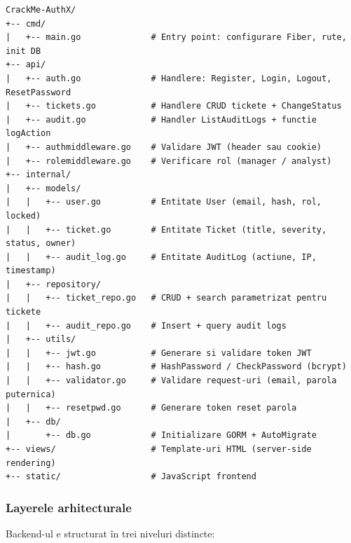 \documentclass[12pt]{article}
\begin{document}
\begin{verbatim}
CrackMe-AuthX/
+-- cmd/
|   +-- main.go              # Entry point: configurare Fiber, rute, init DB
+-- api/
|   +-- auth.go              # Handlere: Register, Login, Logout, ResetPassword
|   +-- tickets.go           # Handlere CRUD tickete + ChangeStatus
|   +-- audit.go             # Handler ListAuditLogs + functie logAction
|   +-- authmiddleware.go    # Validare JWT (header sau cookie)
|   +-- rolemiddleware.go    # Verificare rol (manager / analyst)
+-- internal/
|   +-- models/
|   |   +-- user.go          # Entitate User (email, hash, rol, locked)
|   |   +-- ticket.go        # Entitate Ticket (title, severity, status, owner)
|   |   +-- audit_log.go     # Entitate AuditLog (actiune, IP, timestamp)
|   +-- repository/
|   |   +-- ticket_repo.go   # CRUD + search parametrizat pentru tickete
|   |   +-- audit_repo.go    # Insert + query audit logs
|   +-- utils/
|   |   +-- jwt.go           # Generare si validare token JWT
|   |   +-- hash.go          # HashPassword / CheckPassword (bcrypt)
|   |   +-- validator.go     # Validare request-uri (email, parola puternica)
|   |   +-- resetpwd.go      # Generare token reset parola
|   +-- db/
|       +-- db.go            # Initializare GORM + AutoMigrate
+-- views/                   # Template-uri HTML (server-side rendering)
+-- static/                  # JavaScript frontend
\end{verbatim}

\subsubsection{Layerele arhitecturale}

Backend-ul e structurat în trei niveluri distincte:
\end{document}

